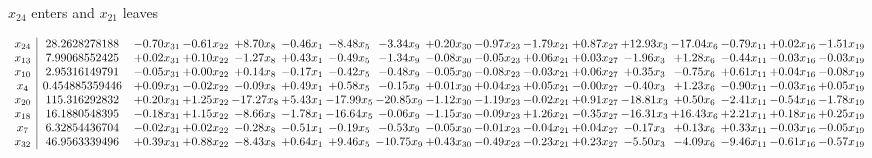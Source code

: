 \documentclass[9pt]{article}
\begin{document}
 $ x_{24} $ enters and $ x_{21} $ leaves 

 \[\begin{array}{c| c c@{\hskip 2pt} c@{\hskip 2pt} c@{\hskip 2pt} c@{\hskip 2pt} c@{\hskip 2pt} c@{\hskip 2pt} c@{\hskip 2pt} c@{\hskip 2pt} c@{\hskip 2pt} c@{\hskip 2pt} c@{\hskip 2pt} c@{\hskip 2pt} c@{\hskip 2pt} c@{\hskip 2pt} c@{\hskip 2pt} }
 x_{24}   &  28.2628278188 & -0.70 x_{31} & -0.61 x_{22} & +  8.70 x_{8} & -0.46 x_{1} & -8.48 x_{5} & -3.34 x_{9} & +  0.20 x_{30} & -0.97 x_{23} & -1.79 x_{21} & +  0.87 x_{27} & + 12.93 x_{3} & -17.04 x_{6} & -0.79 x_{11} & +  0.02 x_{16} & -1.51 x_{19}\\
 x_{13}   &  7.99068552425 & +  0.02 x_{31} & +  0.10 x_{22} & -1.27 x_{8} & +  0.43 x_{1} & -0.49 x_{5} & -1.34 x_{9} & -0.08 x_{30} & -0.05 x_{23} & +  0.06 x_{21} & +  0.03 x_{27} & -1.96 x_{3} & +  1.28 x_{6} & -0.44 x_{11} & -0.03 x_{16} & -0.03 x_{19}\\
 x_{10}   &  2.95316149791 & -0.05 x_{31} & +  0.00 x_{22} & +  0.14 x_{8} & -0.17 x_{1} & -0.42 x_{5} & -0.48 x_{9} & -0.05 x_{30} & -0.08 x_{23} & -0.03 x_{21} & +  0.06 x_{27} & +  0.35 x_{3} & -0.75 x_{6} & +  0.61 x_{11} & +  0.04 x_{16} & -0.08 x_{19}\\
 x_{4}   &  0.454885359446 & +  0.09 x_{31} & -0.02 x_{22} & -0.09 x_{8} & +  0.49 x_{1} & +  0.58 x_{5} & -0.15 x_{9} & +  0.01 x_{30} & +  0.04 x_{23} & +  0.05 x_{21} & -0.00 x_{27} & -0.40 x_{3} & +  1.23 x_{6} & -0.90 x_{11} & -0.03 x_{16} & +  0.05 x_{19}\\
 x_{20}   &  115.316292832 & +  0.20 x_{31} & +  1.25 x_{22} & -17.27 x_{8} & +  5.43 x_{1} & -17.99 x_{5} & -20.85 x_{9} & -1.12 x_{30} & -1.19 x_{23} & -0.02 x_{21} & +  0.91 x_{27} & -18.81 x_{3} & +  0.50 x_{6} & -2.41 x_{11} & -0.54 x_{16} & -1.78 x_{19}\\
 x_{18}   &  16.1880548395 & -0.18 x_{31} & +  1.15 x_{22} & -8.66 x_{8} & -1.78 x_{1} & -16.64 x_{5} & -0.06 x_{9} & -1.15 x_{30} & -0.09 x_{23} & +  1.26 x_{21} & -0.35 x_{27} & -16.31 x_{3} & + 16.43 x_{6} & +  2.21 x_{11} & +  0.18 x_{16} & +  0.25 x_{19}\\
 x_{7}   &  6.32854436704 & -0.02 x_{31} & +  0.02 x_{22} & -0.28 x_{8} & -0.51 x_{1} & -0.19 x_{5} & -0.53 x_{9} & -0.05 x_{30} & -0.01 x_{23} & -0.04 x_{21} & +  0.04 x_{27} & -0.17 x_{3} & +  0.13 x_{6} & +  0.33 x_{11} & -0.03 x_{16} & -0.05 x_{19}\\
 x_{32}   &  46.9563339496 & +  0.39 x_{31} & +  0.88 x_{22} & -8.43 x_{8} & +  0.64 x_{1} & +  9.46 x_{5} & -10.75 x_{9} & +  0.43 x_{30} & -0.49 x_{23} & -0.23 x_{21} & +  0.23 x_{27} & -5.50 x_{3} & -4.09 x_{6} & -9.46 x_{11} & -0.61 x_{16} & -0.57 x_{19}\\

\end{array}\]
\end{document}
